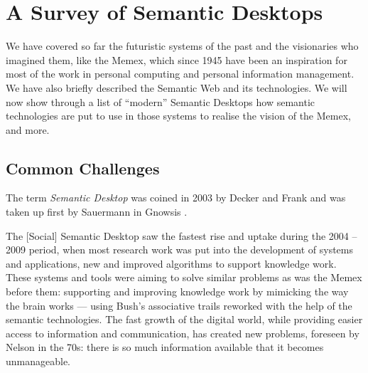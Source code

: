 \section{A Survey of Semantic Desktops}
\label{sec:sd}

We have covered so far the futuristic systems of the past and the visionaries who imagined them, like the Memex, which since 1945 have been an inspiration for most of the work in personal computing and personal information management. We have also briefly described the Semantic Web and its technologies. We will now show through a list of “modern” Semantic Desktops how semantic technologies are put to use in those systems to realise the vision of the Memex, and more.

\subsection{Common Challenges}
\label{sec:sdgoals}

The term \emph{Semantic Desktop} was coined in 2003 by Decker and Frank and was taken up first by Sauermann in Gnowsis \cite{Sauermann2003}. 

The [Social] Semantic Desktop saw the fastest rise and uptake during the 2004 -- 2009 period, when most research work was put into the development of systems and applications, new and improved algorithms to support knowledge work. 
These systems and tools were aiming to solve similar problems as was the Memex before them: supporting and improving knowledge work by mimicking the way the brain works --- using Bush's associative trails reworked with the help of the semantic technologies. 
The fast growth of the digital world, while providing easier access to information and communication, has created new problems, foreseen by Nelson in the 70s: there is so much information available that it becomes unmanageable. 

